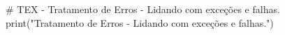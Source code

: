 # TEX - Tratamento de Erros - Lidando com exceções e falhas.
print("Tratamento de Erros - Lidando com exceções e falhas.")
